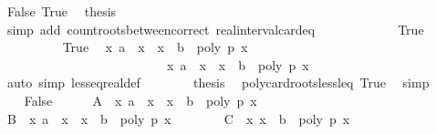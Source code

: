 \begin{isabellebody}
\ False\ True{\isacharprime}\ \isamarkupfalse%
\ {\isacharquery}thesis\ \isanewline
\ \ \ \ \ \ \ \ \ \ \ \ \isamarkupfalse%
\ {\isacharparenleft}simp\ add{\isacharcolon}\ count{\isacharunderscore}roots{\isacharunderscore}between{\isacharunderscore}correct\ real{\isacharunderscore}interval{\isacharunderscore}card{\isacharunderscore}eq{\isacharparenright}\isanewline
\ \ \ \ \isamarkupfalse%
\isanewline
\ \ \ \ \ \ \isamarkupfalse%
\ True\isanewline
\ \ \ \ \ \ \ \ \isamarkupfalse%
\ True{\isacharprime}\ \isamarkupfalse%
\ {\isachardoublequoteopen}{\isacharbraceleft}x{\isachardot}\ a\ {\isasymle}\ x\ {\isasymand}\ x\ {\isacharless}\ b\ {\isasymand}\ poly\ p\ x\ {\isacharequal}\ {}{\isacharbraceright}\ {\isacharequal}\ \isanewline
\ \ \ \ \ \ \ \ \ \ \ \ \ \ \ \ \ \ \ \ \ \ \ \ \ \ {\isacharbraceleft}x{\isachardot}\ a\ {\isacharless}\ x\ {\isasymand}\ x\ {\isasymle}\ b\ {\isasymand}\ poly\ p\ x\ {\isacharequal}\ {}{\isacharbraceright}{\isachardoublequoteclose}\isanewline
\ \ \ \ \ \ \ \ \ \ \isamarkupfalse%
\ {\isacharparenleft}auto\ simp{\isacharcolon}\ less{\isacharunderscore}eq{\isacharunderscore}real{\isacharunderscore}def{\isacharparenright}\isanewline
\ \ \ \ \ \ \isamarkupfalse%
\ {\isacharquery}thesis\ \isamarkupfalse%
\ poly{\isacharunderscore}card{\isacharunderscore}roots{\isacharunderscore}less{\isacharunderscore}leq\ True\ \isamarkupfalse%
\ simp\isanewline
\ \ \isamarkupfalse%
\isanewline
{}\isamarkupfalse%
\isanewline
\ \ \isamarkupfalse%
\ False\isanewline
\ \ \ \ \isamarkupfalse%
\ {\isacharquery}A\ {\isacharequal}\ {\isachardoublequoteopen}{\isacharbraceleft}x{\isachardot}\ a\ {\isasymle}\ x\ {\isasymand}\ x\ {\isacharless}\ b\ {\isasymand}\ poly\ p\ x\ {\isacharequal}\ {}{\isacharbraceright}{\isachardoublequoteclose}\isanewline
\ \ \ \ \isamarkupfalse%
\ {\isacharquery}B\ {\isacharequal}\ {\isachardoublequoteopen}{\isacharbraceleft}x{\isachardot}\ a\ {\isacharless}\ x\ {\isasymand}\ x\ {\isasymle}\ b\ {\isasymand}\ poly\ p\ x\ {\isacharequal}\ {}{\isacharbraceright}{\isachardoublequoteclose}\isanewline
\ \ \ \ \isamarkupfalse%
\ {\isacharquery}C\ {\isacharequal}\ {\isachardoublequoteopen}{\isacharbraceleft}x{\isachardot}\ x\ {\isacharequal}\ b\ {\isasymand}\ poly\ p\ x\ {\isacharequal}\ {}{\isacharbraceright}{\isachardoublequoteclose}\isanewline

\end{isabellebody}
